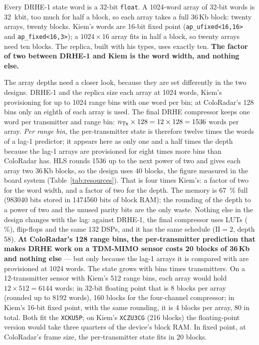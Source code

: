 \noindent
Every DRHE-1 state word is a 32-bit \texttt{float}. A \num{1024}-word array of
32-bit words is \SI{32}{\kilo bit}, too much for half a block, so each array
takes a full 36\,Kb block: twenty arrays, twenty blocks. Kiem's words are
16-bit fixed point (\texttt{ap\_ufixed<16,16>} and \texttt{ap\_fixed<16,3>}); a
$1024 \times 16$ array fits in half a block, so twenty arrays need ten blocks.
The replica, built with his types, uses exactly ten. \textbf{The factor of two
between DRHE-1 and Kiem is the word width, and nothing else.}

The array depths need a closer look, because they are set differently in the
two designs. DRHE-1 and the replica size each array at \num{1024} words, Kiem's
provisioning for up to \num{1024} range bins with one word per bin; at
ColoRadar's 128 bins only an eighth of each array is used. The final DRHE
compressor keeps one word per transmitter and range bin: $n_{\mathrm{Tx}} \times 128 =
12 \times 128 = \num{1536}$ words per array. \emph{Per range bin}, the
per-transmitter state is therefore twelve times the words of a lag-1
predictor; it appears here as only one and a half times the depth because the
lag-1 arrays are provisioned for eight times more bins than ColoRadar has.
HLS rounds \num{1536} up to the next power of two and gives each array two
36\,Kb blocks, so the design uses 40 blocks, the figure measured in the board
system (Table~\ref{tab:resources}). That is four times Kiem's: a factor of two
for the word width, and a factor of two for the depth. The memory is
\SI{67}{\percent} full (\num{983040} bits stored in \num{1474560} bits of block
RAM); the rounding of the depth to a power of two and the unused parity bits are
the only waste. Nothing else in the design changes with the
lag: against DRHE-1, the final compressor uses 
 LUTs (\,\%), 
 flip-flops and the same 132 DSPs, and it has the same
schedule ($\mathrm{II} = 2$, depth 58). \textbf{At ColoRadar's 128 range bins, the per-transmitter
prediction that makes DRHE work on a TDM-MIMO sensor costs 20 blocks of 36\,Kb
and nothing else} --- but only because the lag-1 arrays it is compared with are
provisioned at \num{1024} words. The state grows with bins times transmitters.
On a 12-transmitter sensor with Kiem's 512 range bins, each array would hold
$12 \times 512 = \num{6144}$ words: in 32-bit floating point that is 8 blocks
per array (rounded up to \num{8192} words), 160 blocks for the four-channel
compressor; in Kiem's 16-bit fixed point, with the same rounding, it is 4
blocks per array, 80 in total.
Both fit the \texttt{XCKU5P}; on Kiem's \texttt{XCZU3CG} (216 blocks) the
floating-point version would take three quarters of the device's block RAM.
In fixed point, at ColoRadar's frame size, the per-transmitter state fits in
20 blocks.

